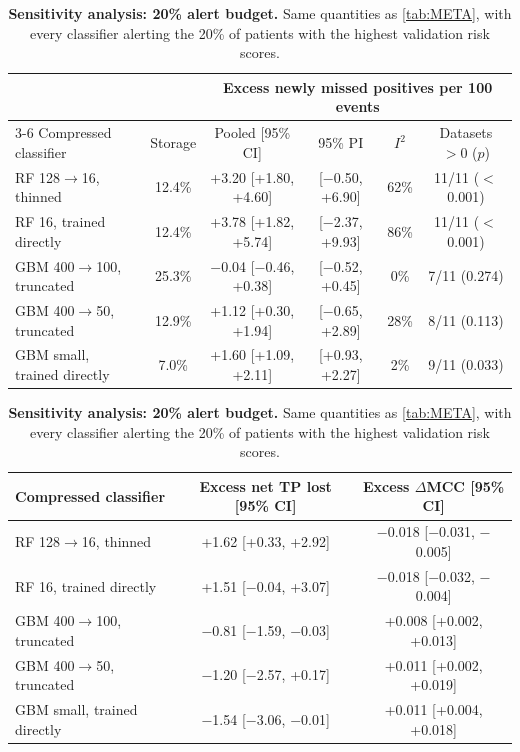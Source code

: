 \begin{table}[!htb]
\centering
\caption{\textbf{Sensitivity analysis: 20\% alert budget.} Same quantities as \autoref{tab:META}, with every classifier alerting the 20\% of patients with the highest validation risk scores.}
\label{tab:META-20}
{\small
\begin{tabular}{lccccc}
\toprule
 & & \multicolumn{4}{c}{Excess newly missed positives per 100 events} \\
\cmidrule(l){3-6}
\rowcolor{white}Compressed classifier & Storage & Pooled [95\% CI] & 95\% PI & $I^2$ & Datasets $>0$ ($p$) \\
\midrule
RF 128$\rightarrow$16, thinned & 12.4\% & +3.20 [+1.80, +4.60] & [$-$0.50, +6.90] & 62\% & 11/11 ($<$0.001) \\
RF 16, trained directly & 12.4\% & +3.78 [+1.82, +5.74] & [$-$2.37, +9.93] & 86\% & 11/11 ($<$0.001) \\
GBM 400$\rightarrow$100, truncated & 25.3\% & $-$0.04 [$-$0.46, +0.38] & [$-$0.52, +0.45] & 0\% & 7/11 (0.274) \\
GBM 400$\rightarrow$50, truncated & 12.9\% & +1.12 [+0.30, +1.94] & [$-$0.65, +2.89] & 28\% & 8/11 (0.113) \\ GBM small, trained directly & 7.0\% & +1.60 [+1.09, +2.11] & [+0.93, +2.27] & 2\% & 9/11 (0.033) \\
\bottomrule
\end{tabular}
\par\vspace{1.2em}
\begin{tabular}{lcc}
\toprule
Compressed classifier & Excess net TP lost [95\% CI] & Excess $\Delta$MCC [95\% CI] \\
\midrule
RF 128$\rightarrow$16, thinned & +1.62 [+0.33, +2.92] & $-$0.018 [$-$0.031, $-$0.005] \\
RF 16, trained directly & +1.51 [$-$0.04, +3.07] & $-$0.018 [$-$0.032, $-$0.004] \\
GBM 400$\rightarrow$100, truncated & $-$0.81 [$-$1.59, $-$0.03] & +0.008 [+0.002, +0.013] \\
GBM 400$\rightarrow$50, truncated & $-$1.20 [$-$2.57, +0.17] & +0.011 [+0.002, +0.019] \\ GBM small, trained directly & $-$1.54 [$-$3.06, $-$0.01] & +0.011 [+0.004, +0.018] \\
\bottomrule
\end{tabular}
}
\end{table}
